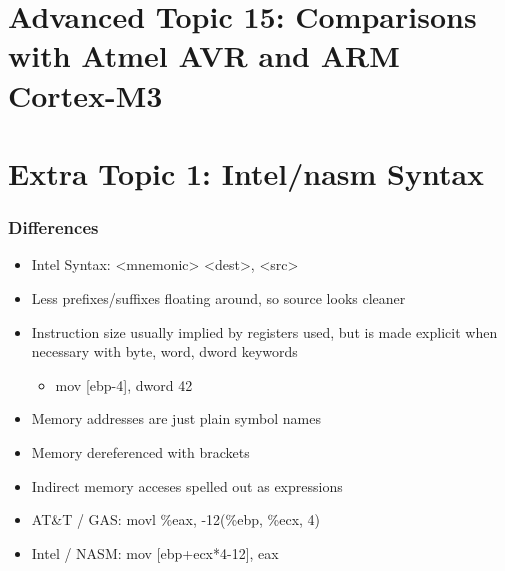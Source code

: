\documentclass[11pt,xcolor=dvipsnames]{beamer}
\newcommand{\vs}{\vspace{0.5em}}
\begin{document}
\section{Advanced Topic 15: Comparisons with Atmel AVR and ARM Cortex-M3}

\section{Extra Topic 1: Intel/nasm Syntax}

\begin{frame}[fragile,t]
\frametitle{Differences}
\begin{itemize}
  \item Intel Syntax: {\ttfamily <mnemonic> <dest>, <src>}
  \item Less prefixes/suffixes floating around, so source looks cleaner
  \item Instruction size usually implied by registers used, but is made explicit when necessary with {\ttfamily byte, word, dword} keywords
  \begin{itemize}
    \item {\ttfamily mov [ebp-4], dword 42}
  \end{itemize}
  \pause
  \item Memory addresses are just plain symbol names
  \item Memory dereferenced with brackets {\ttfamily [ ... ]}
  \pause
  \vs
  \item Indirect memory acceses spelled out as expressions
  \item AT\&T / GAS: {\ttfamily movl \%eax, -12(\%ebp, \%ecx, 4)}
  \item Intel / NASM: {\ttfamily mov [ebp+ecx*4-12], eax}
\end{itemize}
\end{frame}
\end{document}
